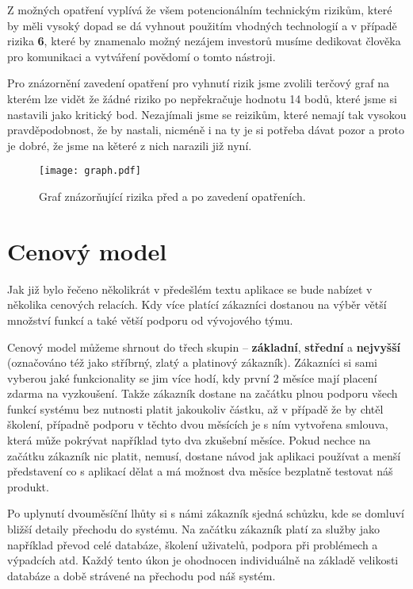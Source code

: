 \par Z možných opatření vyplívá že všem potencionálním technickým rizikům, které by měli vysoký dopad se dá vyhnout použitím vhodných technologií a v případě rizika \textbf{6}, které by znamenalo možný nezájem investorů musíme dedikovat člověka pro komunikaci a vytváření povědomí o tomto nástroji.

\par Pro znázornění zavedení opatření pro vyhnutí rizik jsme zvolili terčový graf na kterém lze vidět že žádné riziko po nepřekračuje hodnotu 14 bodů, které jsme si nastavili jako kritický bod. Nezajímali jsme se reizikům, které nemají tak vysokou pravděpodobnost, že by nastali, nicméně i na ty je si potřeba dávat pozor a proto je dobré, že jsme na kěteré z nich narazili již nyní.

\begin{figure}[!htp]
  \centering
  \texttt{[image: graph.pdf]}
  \caption{Graf znázorňující rizika před a po zavedení opatřeních.}
  \label{risk-graph}
\end{figure}

\section{Cenový model}
\par Jak již bylo řečeno několikrát v předešlém textu aplikace se bude nabízet v několika cenových relacích. Kdy více platící zákazníci dostanou na výběr větší množství funkcí a také větší podporu od vývojového týmu.

\par Cenový model můžeme shrnout do třech skupin -- \textbf{základní}, \textbf{střední} a \textbf{nejvyšší} (označováno též jako stříbrný, zlatý a platinový zákazník). Zákazníci si sami vyberou jaké funkcionality se jim více hodí, kdy první 2 měsíce mají placení zdarma na vyzkoušení. Takže zákazník dostane na začátku plnou podporu všech funkcí systému bez nutnosti platit jakoukoliv částku, až v případě že by chtěl školení, případně podporu v těchto dvou měsících je s ním vytvořena smlouva, která může pokrývat například tyto dva zkušební měsíce. Pokud nechce na začátku zákazník nic platit, nemusí, dostane návod jak aplikaci používat a menší představení co s aplikací dělat a má možnost dva měsíce bezplatně testovat náš produkt.

\par Po uplynutí dvouměsíční lhůty si s námi zákazník sjedná schůzku, kde se domluví bližší detaily přechodu do systému. Na začátku zákazník platí za služby jako například převod celé databáze, školení uživatelů, podpora při problémech a výpadcích atd. Každý tento úkon je ohodnocen individuálně na základě velikosti databáze a době strávené na přechodu pod náš systém.

